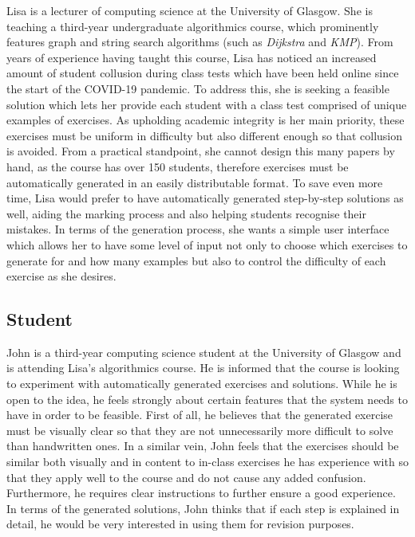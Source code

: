 \documentclass{l4proj}
\begin{document}
Lisa is a lecturer of computing science at the University of Glasgow. She is teaching a third-year undergraduate algorithmics course, which prominently features graph and string search algorithms (such as \emph{Dijkstra} and \emph{KMP}). From years of experience having taught this course, Lisa has noticed an increased amount of student collusion during class tests which have been held online since the start of the COVID-19 pandemic. To address this, she is seeking a feasible solution which lets her provide each student with a class test comprised of unique examples of exercises. As upholding academic integrity is her main priority, these exercises must be uniform in difficulty but also different enough so that collusion is avoided. From a practical standpoint, she cannot design this many papers by hand, as the course has over 150 students, therefore exercises must be automatically generated in an easily distributable format. To save even more time, Lisa would prefer to have automatically generated step-by-step solutions as well, aiding the marking process and also helping students recognise their mistakes. In terms of the generation process, she wants a simple user interface which allows her to have some level of input not only to choose which exercises to generate for and how many examples but also to control the difficulty of each exercise as she desires.

\subsection{Student}

John is a third-year computing science student at the University of Glasgow and is attending Lisa's algorithmics course. He is informed that the course is looking to experiment with automatically generated exercises and solutions. While he is open to the idea, he feels strongly about certain features that the system needs to have in order to be feasible. First of all, he believes that the generated exercise must be visually clear so that they are not unnecessarily more difficult to solve than handwritten ones. In a similar vein, John feels that the exercises should be similar both visually and in content to in-class exercises he has experience with so that they apply well to the course and do not cause any added confusion. Furthermore, he requires clear instructions to further ensure a good experience. In terms of the generated solutions, John thinks that if each step is explained in detail, he would be very interested in using them for revision purposes.
\end{document}
